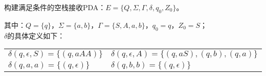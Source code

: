 \begin{solution}
    构建满足条件的空栈接收PDA：$E=\{Q,\Sigma,\Gamma,\delta,q_0,Z_0\}$。

    其中：$Q=\{q\}$，$\Sigma=\{a,b\}$，$\Gamma=\{S,A,a,b\}$，$q_0 = q$，$Z_0=S$；\\
    $\delta$的具体定义如下：\\
    \begin{tabular}{ll}
        $\delta(q,\epsilon,S) = \{(q,aAA)\}$
        &$\delta(q,\epsilon,A) = \{(q,aS),(q,b),(q,a)\}$\\
        $\delta(q,a,a) = \{(q,\epsilon)\}$
        &$\delta(q,b,b) = \{(q,\epsilon)\}$
    \end{tabular}
\end{solution}